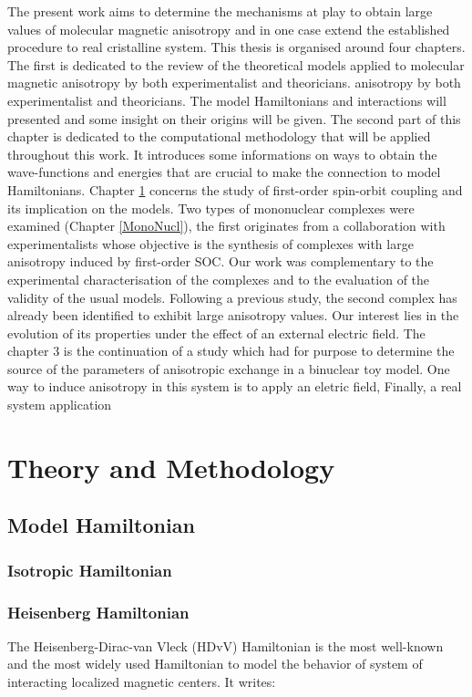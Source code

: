 \documentclass[12pt]{report}
\numberwithin{equation}{section}
\begin{document}
The present work aims to determine the mechanisms at play to obtain large values of molecular magnetic anisotropy and in one case extend the established procedure to real cristalline system.
This thesis is organised around four chapters. The first is dedicated to the review of the theoretical models applied to molecular magnetic anisotropy by both experimentalist and theoricians.
anisotropy by both experimentalist and theoricians.
The model Hamiltonians and interactions will presented and some insight on their origins will be given.
The second part of this chapter is dedicated to the computational methodology that will be applied throughout this work.
It introduces some informations on ways to obtain the wave-functions and energies that are crucial to make the connection to model Hamiltonians.
Chapter \ref{TheoryMethod} concerns the study of first-order spin-orbit coupling and its implication on the models. 
Two types of mononuclear complexes were examined (Chapter \ref{MonoNucl}), the first originates from a collaboration with experimentalists whose objective is the synthesis of complexes with large anisotropy induced by first-order SOC.
Our work was complementary to the experimental characterisation of the complexes and to the evaluation of the validity of the usual models.
Following a previous study, the second complex has already been identified to exhibit large anisotropy values.
Our interest lies in the evolution of its properties under the effect of an external electric field.
The chapter 3 is the continuation of a study which had for purpose to determine the source of the parameters of anisotropic exchange in a binuclear toy model.
One way to induce anisotropy in this system is to apply an eletric field,
Finally, a real system application 



\chapter{Theory and Methodology}
\label{TheoryMethod}
\section{Model Hamiltonian}

\subsection{Isotropic Hamiltonian}

\subsection*{Heisenberg Hamiltonian}
The Heisenberg-Dirac-van Vleck (HDvV) Hamiltonian is the most well-known and the most widely used Hamiltonian to model the behavior of system of interacting localized magnetic centers. It writes:
\end{document}
